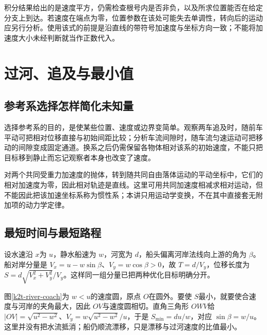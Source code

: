 积分结果给出的是速度平方，仍需检查根号内是否非负，以及所求位置能否在给定分支上到达。若速度在端点为零，位置参数在该处可能失去单调性，转向后的运动应另行分析。使用该式的前提是沿直线的带符号加速度与坐标方向一致；不能将加速度大小未经判断就当作正数代入。

\section{过河、追及与最小值}
\subsection{参考系选择怎样简化未知量}
选择参考系的目的，是使某些位置、速度或边界变简单。观察两车追及时，随前车平动可把相对位移直接与初始间距比较；分析车流间隙时，随车流匀速运动可把移动的间隙变成固定通道。换系之后仍需保留各物体相对该系的初始速度，不能只把目标移到静止而忘记观察者本身也改变了速度。

对两个共同受重力加速度的抛体，转到随共同自由落体运动的平动坐标中，它们的相对加速度为零，因此相对轨迹是直线。这里可用共同加速度相减求相对运动，但不能因此把该加速坐标系称为惯性系；本讲只用运动学变换，不在其中直接套无附加项的动力学定律。

\subsection{最短时间与最短路程}
设水速沿 $x$为 $u$，静水船速为 $w$，河宽为 $d$，船头偏离河岸法线向上游的角为 $\beta$。船对岸分量是 $V_x=u-w\sin\beta$、$V_y=w\cos\beta>0$，故 $T=d/V_y$，位移长度为 $S=d\sqrt{V_x^2+V_y^2}/V_y$。这样同一组分量已把两种优化目标明确分开。

图\ref{k2t-river-coach}为 $w<u$的速度圆，原点 $O$在圆外。要使 $S$最小，就要使合速度与河岸的夹角最大，因此 $OV$与速度圆相切。直角三角形 $OWV$给 $|OV|=\sqrt{u^2-w^2}$、$V_y=w\sqrt{u^2-w^2}/u$，于是 $S_{\min}=du/w$，对应 $\sin\beta=w/u$。这里并没有把水流抵消；船仍顺流漂移，只是漂移与过河速度的比值最小。

